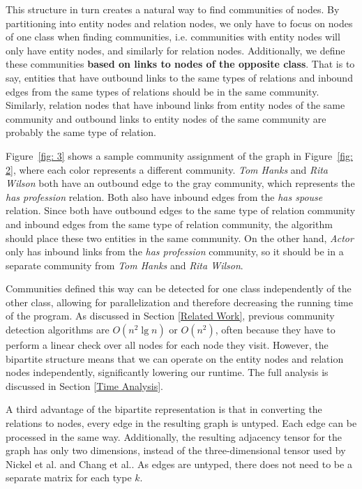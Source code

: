 \documentclass[12pt]{article}
\begin{document}
This structure in turn creates a natural way to find communities of nodes. By
partitioning into entity nodes and relation nodes, we only have to focus on
nodes of one class when finding communities, i.e. communities with entity nodes
will only have entity nodes, and similarly for relation nodes. Additionally, we
define these communities \textbf{based on links to nodes of the opposite class}.
That is to say, entities that have outbound links to the same types of relations
and inbound edges from the same types of relations should be in the same
community. Similarly, relation nodes that have inbound links from entity nodes
of the same community and outbound links to entity nodes of the same community
are probably the same type of relation.

Figure~\ref{fig: 3} shows a sample community assignment of the graph in
Figure~\ref{fig: 2}, where each color represents a different community.
\textit{Tom Hanks} and \textit{Rita Wilson} both have an outbound edge to the
gray community, which represents the \textit{has profession} relation. Both also
have inbound edges from the \textit{has spouse} relation. Since both have
outbound edges to the same type of relation community and inbound edges from the
same type of relation community, the algorithm should place these two entities
in the same community. On the other hand, \textit{Actor} only has inbound links
from the \textit{has profession} community, so it should be in a separate
community from \textit{Tom Hanks} and \textit{Rita Wilson}.

Communities defined this way can be detected for one class independently of the
other class, allowing for parallelization and therefore decreasing the running
time of the program. As discussed in Section \ref{Related Work}, previous
community detection algorithms are $O(n^2\lg n)$ or $O(n^2)$, often because they
have to perform a linear check over all nodes for each node they visit. However,
the bipartite structure means that we can operate on the entity nodes and
relation nodes independently, significantly lowering our runtime. The full
analysis is discussed in Section \ref{Time Analysis}.

A third advantage of the bipartite representation is that in converting the
relations to nodes, every edge in the resulting graph is untyped. Each edge can
be processed in the same way. Additionally, the resulting adjacency tensor for
the graph has only two dimensions, instead of the three-dimensional tensor used
by Nickel et al.\cite{Nickel2011} and Chang et al.\cite{Chang2011}. As edges
are untyped, there does not need to be a separate matrix for each type $k$.
\end{document}
